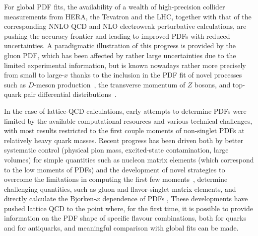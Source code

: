 
%
For global PDF fits, the availability of a wealth of high-precision collider measurements
from HERA, the Tevatron and the LHC, together with that of the corresponding
NNLO QCD and NLO electroweak perturbative calculations, are pushing the
accuracy frontier and leading to improved PDFs with reduced uncertainties.
A paradigmatic illustration of this progress is provided by the gluon PDF, which has been
affected by rather large uncertainties due to the limited experimental
information, but is known nowadays rather more precisely from small to large-$x$
thanks to the inclusion in the
PDF fit of novel processes such as $D$-meson production~\cite{Gauld:2016kpd},
the transverse momentum of $Z$ bosons, and top-quark pair differential
distributions~\cite{Czakon:2016olj}. 

In the case of lattice-QCD calculations, early attempts to determine PDFs were limited by the 
available computational resources and various technical challenges, with most results restricted to
the first couple moments of non-singlet PDFs at relatively heavy quark masses. Recent progress has been driven both
by better systematic control (physical pion mass, excited-state contamination, large volumes) 
for simple quantities such as nucleon matrix elements (which correspond to the low moments of PDFs) and the development of novel
strategies to overcome the limitations in computing the first few 
moments~\cite{Constantinou:2014tga,Syritsyn:2014saa,Lin:2012ev}, determine challenging quantities, 
such as gluon and flavor-singlet matrix elements, and directly calculate the Bjorken-$x$ dependence of PDFs \cite{Lin:2014zya,Alexandrou:2015rja,Chen:2016utp,Alexandrou:2016jqi},
These developments have pushed lattice QCD to the point where, for the first time, it is possible to provide information on the PDF shape
of specific flavour combinations, both for quarks and for antiquarks, and meaningful comparison with 
global fits can be made.

